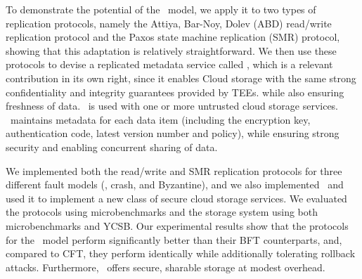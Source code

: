 To demonstrate the potential of the \faultmodel\ model, we apply it to
two types of replication protocols, namely the Attiya, Bar-Noy, Dolev
(ABD) read/write replication protocol and the Paxos
state machine replication (SMR)
protocol, showing that this adaptation is relatively straightforward.
We then use these protocols to devise a replicated metadata service
called \sys, which is a relevant contribution in its own right, since
it enables Cloud storage with the same strong confidentiality and
integrity guarantees provided by \acp{TEE}. while also ensuring freshness
of data.
\sys\ is used with one or more untrusted cloud storage
services. \sys\ maintains metadata for each data item (including the
encryption key, authentication code, latest version number and
policy), while ensuring strong security and enabling concurrent
sharing of data.



We implemented both the read/write and SMR replication protocols for
three different fault models (\faultmodel, crash, and Byzantine), and
we also implemented \sys\ and used it to implement a new class of
secure cloud storage services. We evaluated the protocols using
microbenchmarks and the storage system using both microbenchmarks and
YCSB.  Our experimental results show that the protocols for the
\faultmodel\ model perform significantly better than their BFT
counterparts, and, compared to CFT, they perform identically while
additionally tolerating rollback attacks.
Furthermore, \sys\ offers secure, sharable storage at modest overhead.

